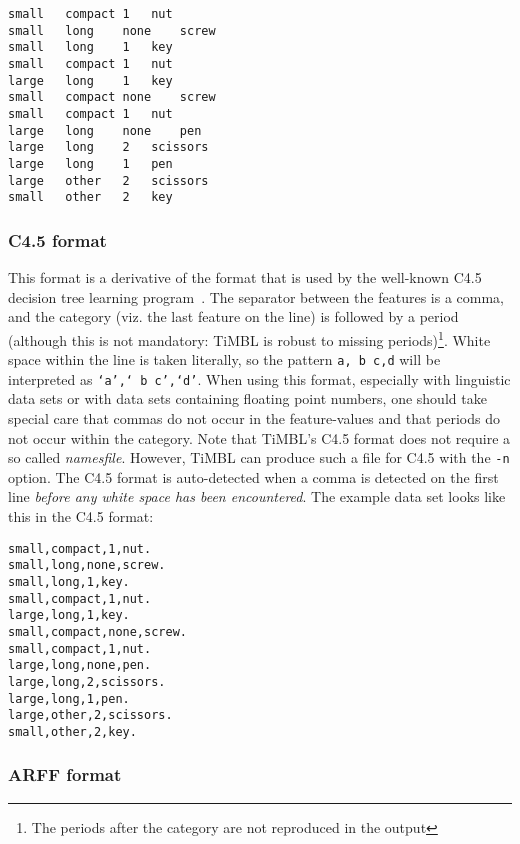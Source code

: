 \documentclass{report}
\begin{document}
\begin{footnotesize}
\begin{verbatim}
small	compact	1	nut
small	long	none	screw
small	long	1	key
small	compact	1	nut
large	long	1	key
small	compact	none	screw
small	compact	1	nut
large	long	none	pen
large	long	2	scissors
large	long	1	pen
large	other	2	scissors
small	other	2	key
\end{verbatim}
\end{footnotesize}

\subsubsection{C4.5 format}
\label{c45format}

This format is a derivative of the format that is used by the
well-known C4.5 decision tree learning program~\cite{Quinlan93}.  The
separator between the features is a comma, and the category (viz.  the
last feature on the line) is followed by a period (although this is
not mandatory: TiMBL is robust to missing periods)\footnote{The
periods after the category are not reproduced in the output}.  White
space within the line is taken literally, so the pattern {\tt a,\ b\
c,d} will be interpreted as {\tt `a',`\ b\ c',`d'}.  When using this
format, especially with linguistic data sets or with data sets
containing floating point numbers, one should take special care that
commas do not occur in the feature-values and that periods do not
occur within the category.  Note that TiMBL's C4.5 format does not
require a so called {\em namesfile}.  However, TiMBL can produce such
a file for C4.5 with the {\tt -n} option.  The C4.5 format is
auto-detected when a comma is detected on the first line {\em before
any white space has been encountered}. The example data set looks like
this in the C4.5 format:

\begin{footnotesize}
\begin{verbatim}
small,compact,1,nut.
small,long,none,screw.
small,long,1,key.
small,compact,1,nut.
large,long,1,key.
small,compact,none,screw.
small,compact,1,nut.
large,long,none,pen.
large,long,2,scissors.
large,long,1,pen.
large,other,2,scissors.
small,other,2,key.
\end{verbatim}
\end{footnotesize}

\subsubsection{ARFF format}
\label{arffformat}
\end{document}
